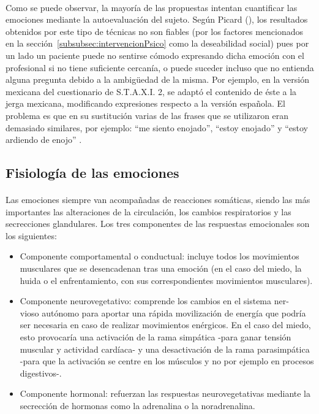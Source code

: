 \paragraph{}
Como se puede observar, la mayoría de las propuestas intentan cuantificar las emociones mediante la autoevaluación del sujeto. Según Picard (\citeyear{picard2009future}), los resultados obtenidos por este tipo de técnicas no son fiables (por los factores mencionados en la sección~\ref{subsubsec:intervencionPsico} como la deseabilidad social) pues por un lado un paciente puede no sentirse cómodo expresando dicha emoción con el profesional si no tiene suficiente cercanía, o puede suceder incluso que no entienda alguna pregunta debido a la ambigüedad de la misma. Por ejemplo, en la versión mexicana del cuestionario de S.T.A.X.I. 2, se adaptó el contenido de éste a la jerga mexicana, modificando expresiones respecto a la versión española. El problema es que en su sustitución varias de las frases que se utilizaron eran demasiado similares, por ejemplo: ``me siento enojado'', ``estoy enojado'' y ``estoy ardiendo de enojo'' \citep{oliva2010validacion}.




\subsection{Fisiología de las emociones}
\label{subsec:fisioEmoc}

\paragraph{}
Las emociones siempre van acompañadas de reacciones somáticas, siendo las más importantes las alteraciones de la circulación, los cambios respiratorios y las secrecciones glandulares. Los tres componentes de las respuestas emocionales son los siguientes:

\begin{itemize}
    \item Componente comportamental o conductual: incluye todos los movimientos musculares que se desencadenan tras una emoción (en el caso del miedo, la huida o el enfrentamiento, con sus correspondientes movimientos musculares).
    
    \item Componente neurovegetativo: comprende los cambios en el sistema ner-\\vioso autónomo para aportar una rápida movilización de energía que podría ser necesaria en caso de realizar movimientos enérgicos. En el caso del miedo, esto provocaría una activación de la rama simpática -para ganar tensión muscular y actividad cardíaca- y una desactivación de la rama parasimpática -para que la activación se centre en los músculos y no por ejemplo en procesos digestivos-.
    
    \item Componente hormonal: refuerzan las respuestas neurovegetativas mediante la secrección de hormonas como la adrenalina o la noradrenalina.
\end{itemize}


